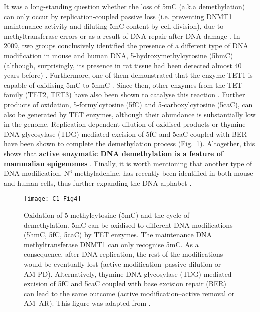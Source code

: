 It was a long-standing question whether the loss of 5mC (a.k.a demethylation) can only occur by replication-coupled passive loss (i.e. preventing DNMT1 maintenance activity and diluting 5mC content by cell division), due to methyltransferase errors or as a result of DNA repair after DNA damage \cite{Iurlaro2017}. In 2009, two groups conclusively identified the presence of a different type of DNA modification in mouse and human DNA, 5-hydroxymethylcytosine (\acrshort{5hmC}) \cite{Kriaucionis2009,Tahiliani2009} (although, surprisingly, its presence in rat tissue had been detected almost 40 years before) \cite{Penn1972}. Furthermore, one of them demonstrated that the enzyme TET1 is capable of oxidising 5mC to 5hmC \cite{Tahiliani2009}. Since then, other enzymes from the TET family (TET2, TET3) have also been shown to catalyse this reaction \cite{Ito2010}. Further products of oxidation, 5-formylcytosine (\acrshort{5fC}) and 5-carboxylcytosine (\acrshort{5caC}), can also be generated by TET enzymes, although their abundance is substantially low in the genome. Replication-dependent dilution of oxidised products or thymine DNA glycosylase (\acrshort{TDG})-mediated excision of 5fC and 5caC coupled with \acrshort{BER} have been shown to complete the demethylation process (Fig.~\ref{fig:c1_fig4}). Altogether, this shows that \textbf{active enzymatic DNA demethylation is a feature of mammalian epigenomes} \cite{Wu2017}. Finally, it is worth mentioning that another type of DNA modification, N$^6$-methyladenine, has recently been identified in both mouse and human cells, thus further expanding the DNA alphabet \cite{Wu2016,Xiao2018}.

\begin{figure}[htbp!] 
	\centering    
	\texttt{[image: C1\_Fig4]}
	\vspace*{1 mm}
	\caption[Oxidation of 5-methylcytosine and the cycle of demethylation]{Oxidation of 5-methylcytosine (5mC) and the cycle of demethylation. 5mC can be oxidised to different DNA modifications (5hmC, 5fC, 5caC) by TET enzymes. The maintenance DNA methyltransferase DNMT1 can only recognise 5mC. As a consequence, after DNA replication, the rest of the modifications would be eventually lost (active modification–passive dilution or AM-PD). Alternatively, thymine DNA glycosylase (\acrshort{TDG})-mediated excision of 5fC and 5caC coupled with base excision repair (\acrshort{BER}) can lead to the same outcome (active modification–active removal or AM–AR). This figure was adapted from \cite{Wu2017}.}
	\label{fig:c1_fig4}
\end{figure}

